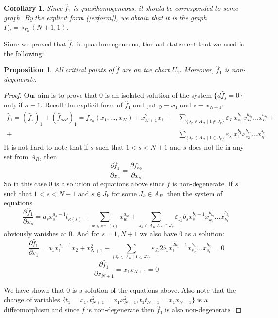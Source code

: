 \documentclass[reqno,12pt]{amsart}
\numberwithin{equation}{section}
\theoremstyle{plain}
\newtheorem{corollary}[theorem]{Corollary}
\newtheorem{proposition}[theorem]{Proposition}
\theoremstyle{definition}
\begin{document}
\begin{corollary}
    Since $\hat{f}_{1}$ is quasihomogeneous, it should be corresponded to some graph. By the explicit form (\ref{exform}), we obtain that it is the graph $\Gamma_{\bar{\kappa}} = \circ_{\Gamma_\kappa}(N+1, 1)$.
\end{corollary}


Since we proved that $\hat{f}_{1}$ is quasihomogeneous, the last statement that we need is the following:
\begin{proposition}
     All critical points of $\hat{f}$ are on the chart $U_{1}$. Moreover, $\hat{f}_{1}$ is non-degenerate.
\end{proposition}
\begin{proof}
Our aim is to prove that $0$ is an isolated solution of the system $\{d \hat{f}_{s} = 0\}$ only if $s=1$. Recall the explicit form of $\hat{f}_{1}$ and put $y = x_1$ and $z=x_{N+1}$:
\begin{align*}
  \hat{f}_{1} = (\hat{f}_\kappa)_{1} + (\hat{f}_{add})_{1} = f_{\kappa_0}(x_1,\dots,x_N) + x_{N+1}^2x_1 +& \sum_{\{J_r \in A_R\;|\;
1 \notin J_r\}} \varepsilon_{J_r}x_{s_1}^{b_{s_1}}x_{s_2}^{b_{s_2}} \dots x_{s_l}^{b_{s_l}} +\\ +& \sum_{\{J_r \in A_R\;|\;
1 \in J_r\}} \varepsilon_{J_r}x_{1}^{b_1}x_{s_2}^{b_{s_2}} \dots x_{s_l}^{b_{s_l}}
\end{align*}
It is not hard to note that if $s$ such that $1 < s < N+1$ and $s$ does not lie in any set from $A_R$, then
\[\frac{\partial \hat{f}_{1}}{\partial x_s} =  \frac{\partial f_{\kappa_0}}{\partial x_s} \]
So in this case $0$ is a solution of equations above since $f$ is non-degenerate.
If $s$ such that $1 < s < N+1$ and $s\in J_k$ for some $J_k \in A_R$, then the system of equations
\[\frac{\partial \hat{f}_1}{\partial x_s} = a_sx_s^{a_s-1}t_{\kappa(s)} + \sum_{w \in \kappa^{-1}(s)}x_w^{a_w} + \sum_{J_k \in A_R \wedge s \in J_k} \varepsilon_{J_k}b_{s}x_{s}^{b_{s}-1}x_{k_2}^{b_{k_2}} \dots x_{k_l}^{b_{k_l}} \]
obviously vanishes at $0$. And for $s = 1,N+1$ we also have $0$ as a solution:
\[
\frac{\partial \hat{f}_{1}}{\partial x_1} = a_1x_1^{a_1-1}x_{2} + x_{N+1}^2 + \sum_{\{J_r \in A_R\;|\;
1 \in J_r\}} \varepsilon_{J_r}2b_1x_{1}^{2b_1-1}x_{s_2}^{b_{s_2}} \dots x_{s_l}^{b_{s_l}} = 0
\]
\[
\frac{\partial \hat{f}_1}{\partial x_{N+1}} = x_1x_{N+1} = 0
\]

We have shown that $0$ is a solution of the equations above. Also note that the change of variables $\{t_1 = x_1, t_{N+1}^2 = x_1x_{N+1}^2, t_1t_{N+1}= x_1x_{N+1}\}$ is a diffeomorphism and since $f$ is non-degenerate then  $\hat{f}_1$ is also non-degenerate.


\end{proof}
\end{document}
